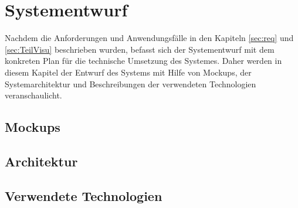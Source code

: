 \chapter{Systementwurf}
\label{sec:Systementwurf}
Nachdem die Anforderungen und Anwendungsf\"alle in den Kapiteln \ref{sec:req} und \ref{sec:TeilVisu} beschrieben wurden, befasst sich der Systementwurf mit dem konkreten Plan f\"ur die technische Umsetzung des Systemes. Daher werden in diesem Kapitel der Entwurf des Systems mit Hilfe von Mockups, der Systemarchitektur und Beschreibungen der verwendeten Technologien veranschaulicht.
\section{Mockups}
\section{Architektur}
\section{Verwendete Technologien}